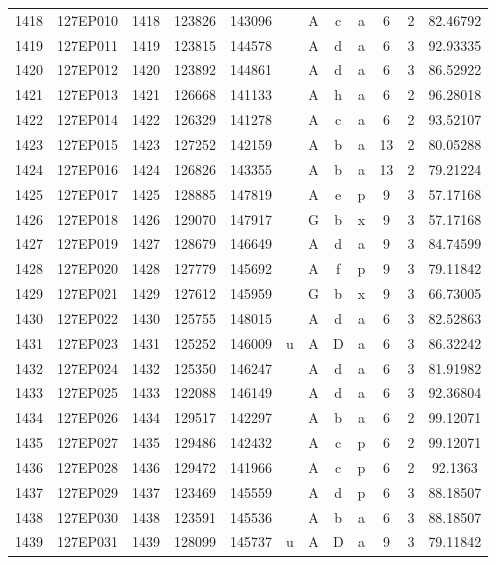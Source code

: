 \begin{tabular}{|*{12}{c|}}
1418 & 127EP010 & 1418 & 123826 & 143096 &  & A & c & a & 6 & 2 & 82.46792 \\ 
1419 & 127EP011 & 1419 & 123815 & 144578 &  & A & d & a & 6 & 3 & 92.93335 \\ 
1420 & 127EP012 & 1420 & 123892 & 144861 &  & A & d & a & 6 & 3 & 86.52922 \\ 
1421 & 127EP013 & 1421 & 126668 & 141133 &  & A & h & a & 6 & 2 & 96.28018 \\ 
1422 & 127EP014 & 1422 & 126329 & 141278 &  & A & c & a & 6 & 2 & 93.52107 \\ 
1423 & 127EP015 & 1423 & 127252 & 142159 &  & A & b & a & 13 & 2 & 80.05288 \\ 
1424 & 127EP016 & 1424 & 126826 & 143355 &  & A & b & a & 13 & 2 & 79.21224 \\ 
1425 & 127EP017 & 1425 & 128885 & 147819 &  & A & e & p & 9 & 3 & 57.17168 \\ 
1426 & 127EP018 & 1426 & 129070 & 147917 &  & G & b & x & 9 & 3 & 57.17168 \\ 
1427 & 127EP019 & 1427 & 128679 & 146649 &  & A & d & a & 9 & 3 & 84.74599 \\ 
1428 & 127EP020 & 1428 & 127779 & 145692 &  & A & f & p & 9 & 3 & 79.11842 \\ 
1429 & 127EP021 & 1429 & 127612 & 145959 &  & G & b & x & 9 & 3 & 66.73005 \\ 
1430 & 127EP022 & 1430 & 125755 & 148015 &  & A & d & a & 6 & 3 & 82.52863 \\ 
1431 & 127EP023 & 1431 & 125252 & 146009 & u & A & D & a & 6 & 3 & 86.32242 \\ 
1432 & 127EP024 & 1432 & 125350 & 146247 &  & A & d & a & 6 & 3 & 81.91982 \\ 
1433 & 127EP025 & 1433 & 122088 & 146149 &  & A & d & a & 6 & 3 & 92.36804 \\ 
1434 & 127EP026 & 1434 & 129517 & 142297 &  & A & b & a & 6 & 2 & 99.12071 \\ 
1435 & 127EP027 & 1435 & 129486 & 142432 &  & A & c & p & 6 & 2 & 99.12071 \\ 
1436 & 127EP028 & 1436 & 129472 & 141966 &  & A & c & p & 6 & 2 & 92.1363 \\ 
1437 & 127EP029 & 1437 & 123469 & 145559 &  & A & d & p & 6 & 3 & 88.18507 \\ 
1438 & 127EP030 & 1438 & 123591 & 145536 &  & A & b & a & 6 & 3 & 88.18507 \\ 
1439 & 127EP031 & 1439 & 128099 & 145737 & u & A & D & a & 9 & 3 & 79.11842 \\ 

\end{tabular}
